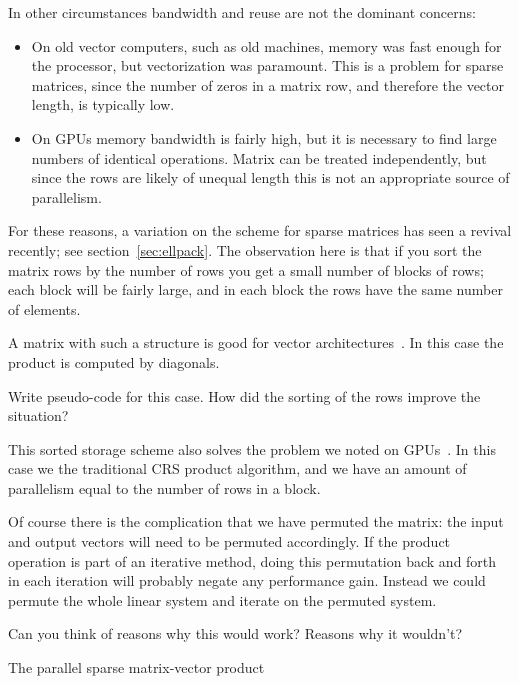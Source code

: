 In other circumstances bandwidth and reuse are not the dominant concerns:
\begin{itemize}
\item On old vector computers, such as old  machines,
  memory was fast enough for the processor, but vectorization was
  paramount. This is a problem for sparse matrices, since the number
  of zeros in a matrix row, and therefore the vector length, is
  typically low.
\item On \acp{GPU} memory bandwidth is fairly high, but it is
  necessary to find large numbers of identical operations. Matrix can
  be treated independently, but since the rows are likely of unequal
  length this is not an appropriate source of parallelism.
\end{itemize}
For these reasons, a variation on the 
scheme for sparse matrices has seen a revival
recently; see section~\ref{sec:ellpack}.
The observation here is that
if you sort the matrix rows by the number of rows you get a small
number of blocks of rows; each block will be fairly large, and in each
block the rows have the same number of elements.

A matrix with such a structure is good for vector
architectures~\cite{DAzevedo2005:vector-mvp}. In this case the product
is computed by diagonals.
\begin{exercise}
  Write pseudo-code for this case. How did the sorting of the rows
  improve the situation?
\end{exercise}

This sorted storage scheme also solves the problem we noted on
\acp{GPU}~\cite{Bolz:GPUsparse}. In this case we the traditional
\ac{CRS} product algorithm, and we have an amount of parallelism equal
to the number of rows in a block.

Of course there is the complication that we have permuted the matrix:
the input and output vectors will need to be permuted accordingly. If
the product operation is part of an iterative method, doing this
permutation back and forth in each iteration will probably negate any
performance gain. Instead we could permute the whole linear system and
iterate on the permuted system.
\begin{exercise}
  Can you think of reasons why this would work? Reasons why it wouldn't?
\end{exercise}

 {The parallel sparse matrix-vector product}


